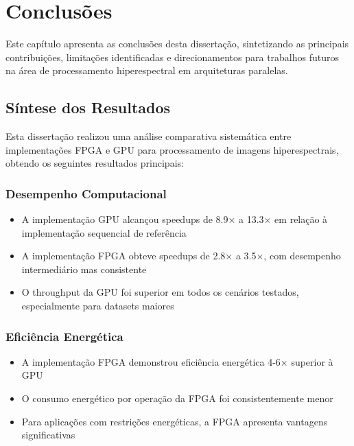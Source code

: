 \chapter{Conclusões}\label{chp:conclusoes}

Este capítulo apresenta as conclusões desta dissertação, sintetizando as principais contribuições, limitações identificadas e direcionamentos para trabalhos futuros na área de processamento hiperespectral em arquiteturas paralelas.

\section{Síntese dos Resultados}\label{sec:sintese_final}

Esta dissertação realizou uma análise comparativa sistemática entre implementações FPGA e GPU para processamento de imagens hiperespectrais, obtendo os seguintes resultados principais:

\subsection{Desempenho Computacional}
\begin{itemize}
    \item A implementação GPU alcançou speedups de 8.9× a 13.3× em relação à implementação sequencial de referência
    \item A implementação FPGA obteve speedups de 2.8× a 3.5×, com desempenho intermediário mas consistente
    \item O throughput da GPU foi superior em todos os cenários testados, especialmente para datasets maiores
\end{itemize}

\subsection{Eficiência Energética}
\begin{itemize}
    \item A implementação FPGA demonstrou eficiência energética 4-6× superior à GPU
    \item O consumo energético por operação da FPGA foi consistentemente menor
    \item Para aplicações com restrições energéticas, a FPGA apresenta vantagens significativas
\end{itemize}

